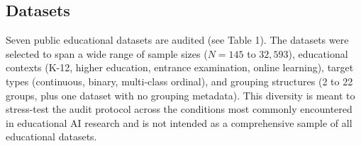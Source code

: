\documentclass[10pt,letterpaper]{article}
\begin{document}
\subsection{Datasets}
Seven public educational datasets are audited (see Table 1). The datasets were selected to span a wide range of sample sizes ($N = 145$ to $32{,}593$), educational contexts (K-12, higher education, entrance examination, online learning), target types (continuous, binary, multi-class ordinal), and grouping structures (2 to 22 groups, plus one dataset with no grouping metadata). This diversity is meant to stress-test the audit protocol across the conditions most commonly encountered in educational AI research and is not intended as a comprehensive sample of all educational datasets.

\begin{table}[H]
\centering
\caption{Overview of the seven audited educational datasets.}
\label{tab:dataset_overview}
%
\end{table}
\end{document}
